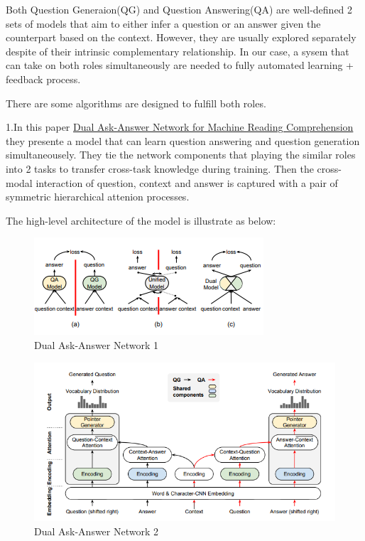 \documentclass[]{book}
\theoremstyle{definition}
\theoremstyle{definition}
\theoremstyle{definition}
\theoremstyle{remark}
\begin{document}
Both Question Generaion(QG) and Question Answering(QA) are well-defined
2 sets of models that aim to either infer a question or an answer given
the counterpart based on the context. However, they are usually explored
separately despite of their intrinsic complementary relationship. In our
case, a sysem that can take on both roles simultaneously are needed to
fully automated learning + feedback process.

There are some algorithms are designed to fulfill both roles.

1.In this paper \href{https://arxiv.org/pdf/1809.01997.pdf}{Dual
Ask-Answer Network for Machine Reading Comprehension} they presente a
model that can learn question answering and question generation
simultaneousely. They tie the network components that playing the
similar roles into 2 tasks to transfer cross-task knowledge during
training. Then the cross-modal interaction of question, context and
answer is captured with a pair of symmetric hierarchical attenion
processes.

The high-level architecture of the model is illustrate as below:

\begin{figure}
\centering
\includegraphics{img/qgqa.png}
\caption{Dual Ask-Answer Network 1}
\end{figure}

\begin{figure}
\centering
\includegraphics{img/daan.png}
\caption{Dual Ask-Answer Network 2}
\end{figure}
\end{document}
